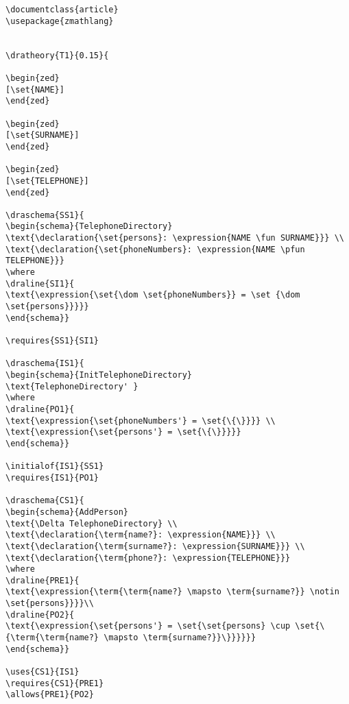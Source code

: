 \begin{verbatim}
\documentclass{article}
\usepackage{zmathlang}


\dratheory{T1}{0.15}{

\begin{zed}
[\set{NAME}] 
\end{zed}

\begin{zed}
[\set{SURNAME}]
\end{zed}

\begin{zed}
[\set{TELEPHONE}]
\end{zed}

\draschema{SS1}{
\begin{schema}{TelephoneDirectory}
\text{\declaration{\set{persons}: \expression{NAME \fun SURNAME}}} \\ 
\text{\declaration{\set{phoneNumbers}: \expression{NAME \pfun TELEPHONE}}}
\where 
\draline{SI1}{
\text{\expression{\set{\dom \set{phoneNumbers}} = \set {\dom \set{persons}}}}}
\end{schema}}

\requires{SS1}{SI1}

\draschema{IS1}{
\begin{schema}{InitTelephoneDirectory} 
\text{TelephoneDirectory' }
\where 
\draline{PO1}{
\text{\expression{\set{phoneNumbers'} = \set{\{\}}}} \\
\text{\expression{\set{persons'} = \set{\{\}}}}}
\end{schema}}

\initialof{IS1}{SS1}
\requires{IS1}{PO1}

\draschema{CS1}{
\begin{schema}{AddPerson}
\text{\Delta TelephoneDirectory} \\
\text{\declaration{\term{name?}: \expression{NAME}}} \\
\text{\declaration{\term{surname?}: \expression{SURNAME}}} \\
\text{\declaration{\term{phone?}: \expression{TELEPHONE}}}
\where
\draline{PRE1}{
\text{\expression{\term{\term{name?} \mapsto \term{surname?}} \notin \set{persons}}}}\\
\draline{PO2}{
\text{\expression{\set{persons'} = \set{\set{persons} \cup \set{\{\term{\term{name?} \mapsto \term{surname?}}\}}}}}}
\end{schema}}

\uses{CS1}{IS1}
\requires{CS1}{PRE1}
\allows{PRE1}{PO2}


\end{verbatim}
